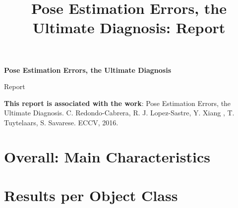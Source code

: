 \documentclass[10pt,onecolumn, a4paper]{article}
\begin{document}
\thispagestyle{empty}

\begin{center}
\vspace{4cm}
\textsf{\textbf{\Huge}}
\end{center}{\Huge \par}

\begin{center}
\vspace{4cm}
\textsf{\textbf{\Huge Pose Estimation Errors, the Ultimate Diagnosis}}
\end{center}{\Huge \par}

\vspace{3cm}

\begin{center}\textsf{\Huge Report}\end{center}{\Huge \par}

\vspace{6cm}
\begin{flushleft}
\textsf{\textbf{This report is associated with the work}: Pose Estimation Errors, the
Ultimate Diagnosis. C. Redondo-Cabrera, R. J. Lopez-Sastre, Y. Xiang , T.
Tuytelaars, S. Savarese. ECCV, 2016.}{\par}
\end{flushleft}
\newpage

\tableofcontents{}\cleardoublepage

\title{Pose Estimation Errors, the Ultimate Diagnosis: Report}

\maketitle
\thispagestyle{empty}

 
\newpage
\section{Overall: Main Characteristics}


\clearpage
\section{Results per Object Class}

\end{document}
